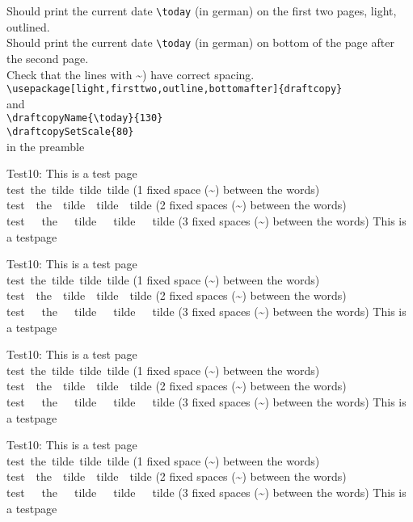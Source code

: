 \documentclass[german]{article}
\newcommand{\xx}{
Test10: This is a test page \thepage \\
test~the~tilde~tilde~tilde (1 fixed space (\~{}) between the words)\\
test~~the~~tilde~~tilde~~tilde (2 fixed spaces (\~{}) between the words)\\
test~~~the~~~tilde~~~tilde~~~tilde (3 fixed spaces (\~{}) between the words)
\vfill
This is a testpage \thepage \newpage
}
\begin{document}
Should print the current date \verb|\today| (in german) on the first two pages,
light, outlined.\\
Should print the current date \verb|\today| (in german) on bottom of the page
after the second page.\\
Check that the lines with \~{}) have correct spacing.\\
\verb|\usepackage[light,firsttwo,outline,bottomafter]{draftcopy}|\\
and \\
\verb|\draftcopyName{\today}{130}|\\
\verb|\draftcopySetScale{80}|\\
in the preamble
\xx\xx\xx\xx
\end{document}

